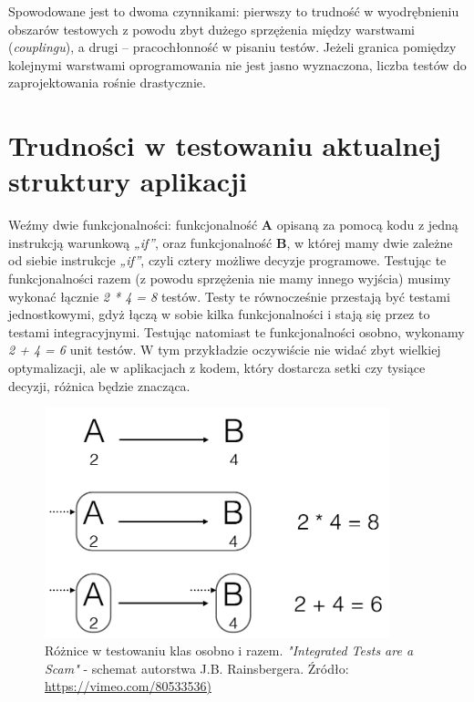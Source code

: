 Spowodowane jest to dwoma czynnikami: pierwszy to trudność w wyodrębnieniu obszarów testowych z powodu zbyt dużego sprzężenia między warstwami (\textit{couplingu}), a drugi – pracochłonność w pisaniu testów. Jeżeli granica pomiędzy kolejnymi warstwami oprogramowania nie jest jasno wyznaczona, liczba testów do zaprojektowania rośnie drastycznie.

\section{Trudności w testowaniu aktualnej struktury aplikacji}
\label{testowanie_starej_struktury}

Weźmy dwie funkcjonalności: funkcjonalność \textbf{A} opisaną za pomocą kodu z jedną instrukcją warunkową \textit{„if”}, oraz funkcjonalność \textbf{B}, w której mamy dwie zależne od siebie instrukcje \textit{„if”}, czyli cztery możliwe decyzje programowe. Testując te funkcjonalności razem (z powodu sprzężenia nie mamy innego wyjścia) musimy wykonać łącznie \textit{2 * 4 = 8} testów. Testy te równocześnie przestają być testami jednostkowymi, gdyż łączą w sobie kilka funkcjonalności i stają się przez to testami integracyjnymi. Testując natomiast te funkcjonalności osobno, wykonamy \textit{2 + 4 = 6} unit testów. W tym przykładzie oczywiście nie widać zbyt wielkiej optymalizacji, ale w aplikacjach z kodem, który dostarcza setki czy tysiące decyzji, różnica będzie znacząca.

\begin{figure}[!htb]
    \centering
    \includegraphics[width=10cm]{imgs/ch3_przyklad_testowania_klas.png}
    \caption
{Różnice w testowaniu klas osobno i razem. \textit{"Integrated Tests are a Scam"} - schemat autorstwa J.B. Rainsbergera. Źródło: \url{https://vimeo.com/80533536)}}
    \label{fig:testowanie_klas}
\end{figure} 

